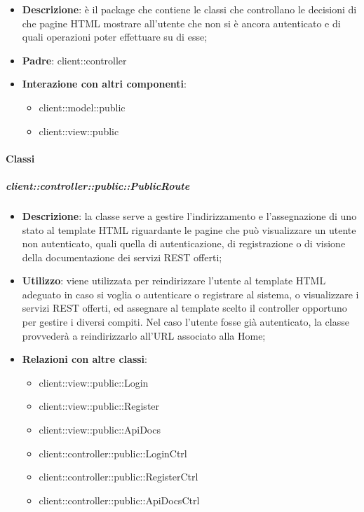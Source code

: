 \begin{itemize}
	\item \textbf{Descrizione}: è il package che contiene le classi che controllano le decisioni di che pagine HTML mostrare all'utente che non si è ancora autenticato e di quali operazioni poter effettuare su di esse;
	\item \textbf{Padre}: client::controller
	\item \textbf{Interazione con altri componenti}:
		\begin{itemize}
			\item client::model::public
			\item client::view::public
		\end{itemize}
\end{itemize}

	\paragraph{Classi} %
		\subparagraph{client::controller::public::PublicRoute} %
		\label{subp:bdsm_app_client_controller_public_publicrouteconfig}
		\begin{itemize}
			\item \textbf{Descrizione}: la classe serve a gestire l'indirizzamento e l'assegnazione di uno stato al template HTML riguardante le pagine che può visualizzare un utente non autenticato, quali quella di autenticazione, di registrazione o di visione della documentazione dei servizi REST offerti;
			\item \textbf{Utilizzo}: viene utilizzata per reindirizzare l'utente al template HTML adeguato in caso si voglia o autenticare o registrare al sistema, o visualizzare i servizi REST offerti, ed assegnare al template scelto il controller opportuno per gestire i diversi compiti. Nel caso l'utente fosse già autenticato, la classe provvederà a reindirizzarlo all'URL associato alla Home;
			\item \textbf{Relazioni con altre classi}:
				\begin{itemize}
					\item client::view::public::Login
					\item client::view::public::Register
					\item client::view::public::ApiDocs
					\item client::controller::public::LoginCtrl
					\item client::controller::public::RegisterCtrl
					\item client::controller::public::ApiDocsCtrl
				\end{itemize}
		\end{itemize}

